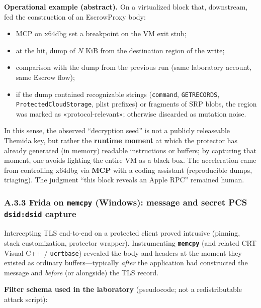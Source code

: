 \documentclass[
  english,
  10pt]{article}
\providecommand{\tightlist}{%
  \setlength{\itemsep}{0pt}\setlength{\parskip}{0pt}}
\begin{document}
\textbf{Operational example (abstract).} On a virtualized block that,
downstream, fed the construction of an EscrowProxy body:

\begin{itemize}
\tightlist
\item
  MCP on x64dbg set a breakpoint on the VM exit stub;
\item
  at the hit, dump of \(N\) KiB from the destination region of the
  write;
\item
  comparison with the dump from the previous run (same laboratory
  account, same Escrow flow);
\item
  if the dump contained recognizable strings (\texttt{command},
  \texttt{GETRECORDS}, \texttt{ProtectedCloudStorage}, plist prefixes)
  or fragments of SRP blobs, the region was marked as
  «protocol-relevant»; otherwise discarded as mutation noise.
\end{itemize}

In this sense, the observed ``decryption seed'' is not a publicly
releaseable Themida key, but rather the \textbf{runtime moment} at which
the protector has already generated (in memory) readable instructions or
buffers; by capturing that moment, one avoids fighting the entire VM as
a black box. The acceleration came from controlling x64dbg via
\textbf{MCP} with a coding assistant (reproducible dumps, triaging). The
judgment ``this block reveals an Apple RPC'' remained human.

\subsubsection{\texorpdfstring{A.3.3 Frida on \texttt{memcpy} (Windows):
message and secret PCS \texttt{dsid:dsid}
capture}{A.3.3 Frida on memcpy (Windows): message and secret PCS dsid:dsid capture}}\label{a.3.3-frida-on-memcpy-windows-message-and-secret-pcs-dsiddsid-capture}

Intercepting TLS end-to-end on a protected client proved intrusive
(pinning, stack customization, protector wrapper). Instrumenting
\textbf{\texttt{memcpy}} (and related CRT Visual C++ /
\texttt{ucrtbase}) revealed the body and headers at the moment they
existed as ordinary buffers---typically \emph{after} the application had
constructed the message and \emph{before} (or alongside) the TLS record.

\textbf{Filter schema used in the laboratory} (pseudocode; not a
redistributable attack script):
\end{document}
